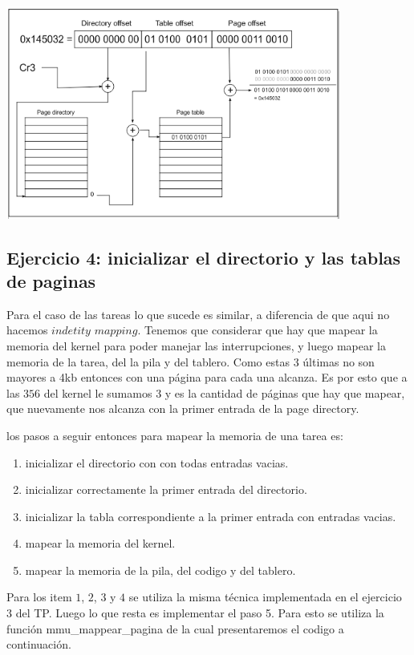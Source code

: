 \documentclass[a4paper,10pt,twoside]{article}
\begin{document}
\includegraphics[height=7cm]{iddMap.png}

\subsection{Ejercicio 4: inicializar el directorio y las tablas de paginas}

Para el caso de las tareas lo que sucede es similar, a diferencia de que aqui no hacemos $indetity$ $mapping$. 
Tenemos que considerar que hay que mapear la memoria del kernel para poder manejar las interrupciones, y luego mapear la memoria de la tarea, del la pila y del tablero. Como estas $3$ últimas no son mayores a 4kb entonces con una página para cada una alcanza. Es por esto que a las $356$ del kernel le sumamos $3$ y es la cantidad de páginas que hay que mapear, que nuevamente nos alcanza con la primer entrada de la page directory.

los pasos a seguir entonces para mapear la memoria de una tarea es:

\begin{enumerate}
 \item inicializar el directorio con con todas entradas vacias.
 \item inicializar correctamente la primer entrada del directorio.
 \item inicializar la tabla correspondiente a la primer entrada con entradas vacias.
 \item mapear la memoria del kernel.
 \item mapear la memoria de la pila, del codigo y del tablero.
\end{enumerate}

Para los item $1$, $2$, $3$ y $4$ se utiliza la misma técnica implementada en el ejercicio $3$ del TP.
Luego lo que resta es implementar el paso 5. Para esto se utiliza la función mmu\_mappear\_pagina de la cual presentaremos el codigo a continuación.\\
\end{document}
